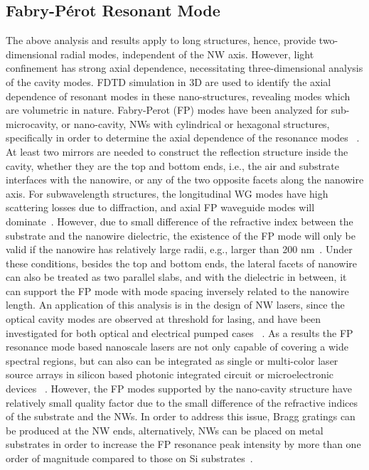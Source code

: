 \subsection{Fabry-P{\'e}rot Resonant Mode}
The above analysis and results apply to long structures, hence, provide
two-dimensional radial modes, independent of the NW axis. However, light
confinement has strong axial dependence, necessitating three-dimensional
analysis of the cavity modes. FDTD simulation in 3D are used to identify the
axial dependence of resonant modes in these nano-structures, revealing modes
which are volumetric in nature.  Fabry-Perot (FP) modes have been analyzed for
sub-microcavity, or nano-cavity, NWs with cylindrical or hexagonal structures,
specifically in order to determine the axial dependence of the resonance modes
~\cite{Maslov:2003cq}. At least two mirrors are needed to construct the reflection structure
inside the cavity, whether they are the top and bottom ends, i.e., the air and
substrate interfaces with the nanowire, or any of the two opposite facets along
the nanowire axis. For subwavelength structures, the longitudinal WG modes have
high scattering losses due to diffraction, and axial FP waveguide modes will
dominate~\cite{Johnson:2002ua}. However, due to small difference of the refractive index between
the substrate and the nanowire dielectric, the existence of the FP mode will
only be valid if the nanowire has relatively large radii, e.g., larger than 200
nm~\cite{Hua:2007fn}. Under these conditions, besides the top and bottom ends, the lateral
facets of nanowire can also be treated as two parallel slabs, and with the
dielectric in between, it can support the FP mode with mode spacing inversely
related to the nanowire length. An application of this analysis is in the
design of NW lasers, since the optical cavity modes are observed at threshold
for lasing, and have been investigated for both optical and electrical pumped
cases ~\cite{Duan:2003en,Saxena:2015cn}. As a results the FP resonance mode based nanoscale lasers are
not only capable of covering a wide spectral regions, but can also can be
integrated as single or multi-color laser source arrays in silicon based
photonic integrated circuit or microelectronic devices ~\cite{Duan:2003en,Saxena:2015cn}. However, the
FP modes supported by the nano-cavity structure have relatively small quality
factor due to the small difference of the refractive indices of the substrate
and the NWs. In order to address this issue,  Bragg gratings can be produced at
the NW ends, alternatively, NWs can be placed on metal substrates in order to
increase the FP resonance peak intensity by more than one order of magnitude
compared to those on Si substrates~\cite{Arab:2014wy}.

